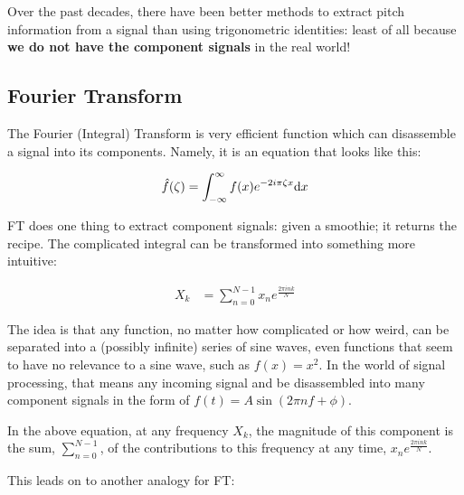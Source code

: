 \documentclass{article}
\begin{document}
Over the past decades, there have been better methods to extract pitch information from a signal than using trigonometric identities: least of all because \textbf{we do not have the component signals} in the real world!

\subsection{Fourier Transform}

The Fourier (Integral) Transform is very efficient function which can disassemble a signal into its components. Namely, it is an equation that looks like this:

\begin{align*}
    \hat{f}(\zeta) & = \int_{-\infty}^{\infty} f(x) e^{-2i\pi\zeta x} \text dx \\
\end{align*}

FT does one thing to extract component signals: given a smoothie; it returns the recipe\cite{AnTransform}. The complicated integral can be transformed into something more intuitive:

\begin{align*}
    X_k & = \sum_{n=0}^{N-1} x_n e^{\frac{2\pi ink}{N}}
\end{align*}

The idea is that any function, no matter how complicated or how weird, can be separated into a (possibly infinite) series of sine waves, even functions that seem to have no relevance to a sine wave, such as $f(x) = x^2$. In the world of signal processing, that means any incoming signal and be disassembled into many component signals in the form of $f(t) = A\sin(2\pi nf + \phi)$.

In the above equation, at any frequency $X_k$, the magnitude of this component is the sum, $\sum_{n=0}^{N-1}$, of the contributions to this frequency at any time, $x_n e^{\frac{2\pi ink}{N}}$. 

This leads on to another analogy for FT: 

\begin{center}
\end{center}
\end{document}
